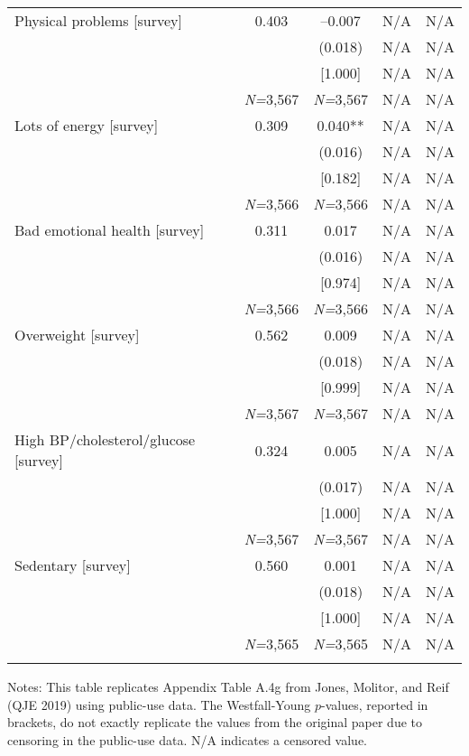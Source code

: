 \documentclass{article}
\begin{document}
\begin{table}[tbp]
{\begin{tabularx}{\linewidth}{lCCCC}
Physical problems [survey]&0.403&--0.007&N/A&N/A \tabularnewline
&&(0.018)&N/A&N/A \tabularnewline
&&[1.000]&N/A&N/A \tabularnewline
&\textit{N=}3,567&\textit{N=}3,567&N/A&N/A \tabularnewline
\addlinespace[1.2ex]
Lots of energy [survey]&0.309&0.040**&N/A&N/A \tabularnewline
&&(0.016)&N/A&N/A \tabularnewline
&&[0.182]&N/A&N/A \tabularnewline
&\textit{N=}3,566&\textit{N=}3,566&N/A&N/A \tabularnewline
\addlinespace[1.2ex]
Bad emotional health [survey]&0.311&0.017&N/A&N/A \tabularnewline
&&(0.016)&N/A&N/A \tabularnewline
&&[0.974]&N/A&N/A \tabularnewline
&\textit{N=}3,566&\textit{N=}3,566&N/A&N/A \tabularnewline
\addlinespace[1.2ex]
Overweight [survey]&0.562&0.009&N/A&N/A \tabularnewline
&&(0.018)&N/A&N/A \tabularnewline
&&[0.999]&N/A&N/A \tabularnewline
&\textit{N=}3,567&\textit{N=}3,567&N/A&N/A \tabularnewline
\addlinespace[1.2ex]
High BP/cholesterol/glucose [survey]&0.324&0.005&N/A&N/A \tabularnewline
&&(0.017)&N/A&N/A \tabularnewline
&&[1.000]&N/A&N/A \tabularnewline
&\textit{N=}3,567&\textit{N=}3,567&N/A&N/A \tabularnewline
\addlinespace[1.2ex]
Sedentary [survey]&0.560&0.001&N/A&N/A \tabularnewline
&&(0.018)&N/A&N/A \tabularnewline
&&[1.000]&N/A&N/A \tabularnewline
&\textit{N=}3,565&\textit{N=}3,565&N/A&N/A \tabularnewline
\bottomrule\addlinespace[-1.5ex] 

\end{tabularx}
\begin{flushleft}
\footnotesize Notes: This table replicates Appendix Table A.4g from Jones, Molitor, and Reif (QJE 2019) using public-use data. The Westfall-Young \(p\)-values, reported in brackets, do not exactly replicate the values from the original paper due to censoring in the public-use data. N/A indicates a censored value.
\end{flushleft}
}
\end{table}
\end{document}

